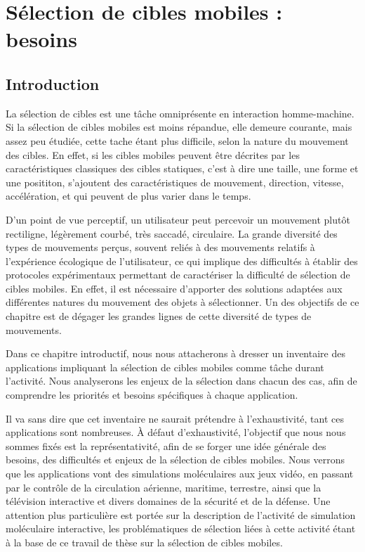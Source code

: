 
\chapter[Sélection de cibles mobiles : besoins]{Sélection de cibles mobiles : besoins}

\setcounter{minitocdepth}{4}
\minitoc
\label{chap1}
\cleardoublepage

	\section{Introduction}
	La sélection de cibles est une tâche omniprésente en interaction homme-machine. Si la sélection de cibles mobiles est moins répandue, elle demeure courante, mais assez peu étudiée, cette tache étant plus difficile, selon la nature du mouvement des cibles. En effet, si les cibles mobiles peuvent être décrites par les caractéristiques classiques des cibles statiques, c'est à dire une taille, une forme et une posititon, s'ajoutent des caractéristiques de mouvement, direction, vitesse,  accélération, et qui peuvent de plus varier dans le temps. 
	
	D'un point de vue perceptif, un utilisateur peut percevoir un mouvement plutôt rectiligne, légèrement courbé, très saccadé, circulaire. La grande diversité des types de mouvements perçus, souvent reliés à des mouvements relatifs à l'expérience écologique de l'utilisateur, ce qui implique des difficultés à établir  des protocoles expérimentaux permettant de caractériser la difficulté de sélection de cibles mobiles. En effet, il est nécessaire d'apporter des solutions  adaptées aux différentes natures du mouvement des objets à sélectionner. Un des objectifs de ce chapitre est de dégager les grandes lignes de cette diversité de types de mouvements.
	
	Dans ce chapitre introductif, nous nous attacherons à dresser un inventaire des applications impliquant la sélection de cibles mobiles comme tâche durant l'activité. Nous analyserons les enjeux de la sélection dans chacun des cas, afin de comprendre les priorités et besoins spécifiques à chaque application.
	
	Il va sans dire que cet inventaire ne saurait prétendre à l'exhaustivité, tant ces applications sont nombreuses. À défaut d'exhaustivité, l'objectif que nous nous sommes fixés est la représentativité, afin de se forger une idée générale des besoins, des difficultés et enjeux de la sélection de cibles mobiles. Nous verrons que les applications vont des simulations moléculaires aux jeux vidéo, en passant par le contrôle de la circulation aérienne, maritime, terrestre, ainsi que la télévision interactive et divers domaines de la sécurité et de la défense. Une attention plus particulière est portée sur la description de l'activité de simulation moléculaire interactive, les problématiques de sélection liées à cette activité étant à la base de ce travail de thèse sur la sélection de cibles mobiles.
	

